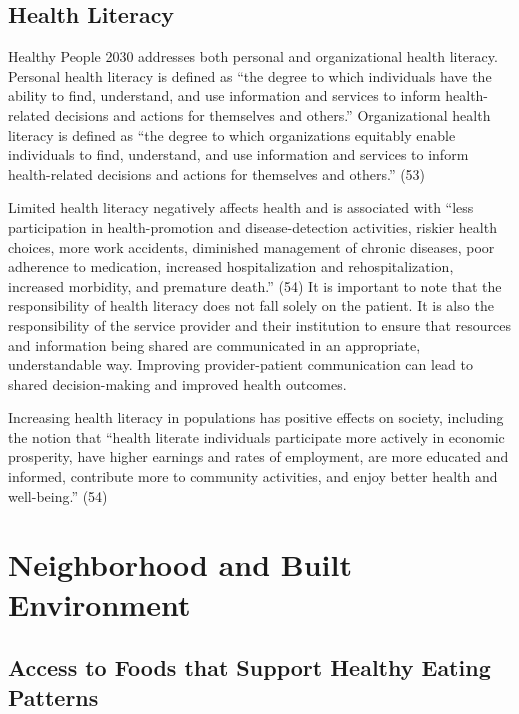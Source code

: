 \documentclass[
  english,
  letterpaper,
]{report}
\begin{document}
\subsection{Health Literacy}\label{health-literacy}

Healthy People 2030 addresses both personal and organizational health
literacy. Personal health literacy is defined as ``the degree to which
individuals have the ability to find, understand, and use information
and services to inform health-related decisions and actions for
themselves and others.'' Organizational health literacy is defined as
``the degree to which organizations equitably enable individuals to
find, understand, and use information and services to inform
health-related decisions and actions for themselves and others.'' (53)

Limited health literacy negatively affects health and is associated with
``less participation in health-promotion and disease-detection
activities, riskier health choices, more work accidents, diminished
management of chronic diseases, poor adherence to medication, increased
hospitalization and rehospitalization, increased morbidity, and
premature death.'' (54) It is important to note that the responsibility
of health literacy does not fall solely on the patient. It is also the
responsibility of the service provider and their institution to ensure
that resources and information being shared are communicated in an
appropriate, understandable way. Improving provider-patient
communication can lead to shared decision-making and improved health
outcomes.

Increasing health literacy in populations has positive effects on
society, including the notion that ``health literate individuals
participate more actively in economic prosperity, have higher earnings
and rates of employment, are more educated and informed, contribute more
to community activities, and enjoy better health and well-being.'' (54)

\section{Neighborhood and Built
Environment}\label{neighborhood-and-built-environment}

\subsection{Access to Foods that Support Healthy Eating
Patterns}\label{access-to-foods-that-support-healthy-eating-patterns}
\end{document}
